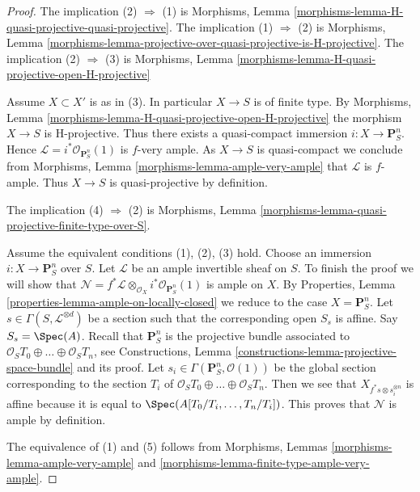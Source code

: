 \begin{proof}
The implication (2) $\Rightarrow$ (1) is
Morphisms, Lemma \ref{morphisms-lemma-H-quasi-projective-quasi-projective}.
The implication (1) $\Rightarrow$ (2) is
Morphisms, Lemma
\ref{morphisms-lemma-projective-over-quasi-projective-is-H-projective}.
The implication (2) $\Rightarrow$ (3) is
Morphisms, Lemma \ref{morphisms-lemma-H-quasi-projective-open-H-projective}

\medskip\noindent
Assume $X \subset X'$ is as in (3). In particular $X \to S$ is
of finite type. By
Morphisms, Lemma \ref{morphisms-lemma-H-quasi-projective-open-H-projective}
the morphism $X \to S$ is H-projective.
Thus there exists a quasi-compact immersion $i : X \to \mathbf{P}^n_S$.
Hence $\mathcal{L} = i^*\mathcal{O}_{\mathbf{P}^n_S}(1)$
is $f$-very ample. As $X \to S$ is quasi-compact we conclude from
Morphisms, Lemma \ref{morphisms-lemma-ample-very-ample}
that $\mathcal{L}$ is $f$-ample. Thus $X \to S$ is quasi-projective
by definition.

\medskip\noindent
The implication (4) $\Rightarrow$ (2) is
Morphisms, Lemma \ref{morphisms-lemma-quasi-projective-finite-type-over-S}.

\medskip\noindent
Assume the equivalent conditions (1), (2), (3) hold.
Choose an immersion $i : X \to \mathbf{P}^n_S$ over $S$.
Let $\mathcal{L}$ be an ample invertible sheaf on $S$. To finish the
proof we will show that
$\mathcal{N} =
f^*\mathcal{L} \otimes_{\mathcal{O}_X} i^*\mathcal{O}_{\mathbf{P}^n_S}(1)$
is ample on $X$. By
Properties, Lemma \ref{properties-lemma-ample-on-locally-closed}
we reduce to the case $X = \mathbf{P}^n_S$. Let
$s \in \Gamma(S, \mathcal{L}^{\otimes d})$ be a section
such that the corresponding open $S_s$ is affine.
Say $S_s = \Spec(A)$.
Recall that $\mathbf{P}^n_S$ is the projective bundle
associated to $\mathcal{O}_S T_0 \oplus \ldots \oplus \mathcal{O}_S T_n$, see
Constructions, Lemma \ref{constructions-lemma-projective-space-bundle}
and its proof.
Let $s_i \in \Gamma(\mathbf{P}^n_S, \mathcal{O}(1))$
be the global section corresponding to the section $T_i$
of $\mathcal{O}_S T_0 \oplus \ldots \oplus \mathcal{O}_S T_n$.
Then we see that $X_{f^*s \otimes s_i^{\otimes n}}$ is affine
because it is equal to $\Spec(A[T_0/T_i, \ldots, T_n/T_i])$.
This proves that $\mathcal{N}$ is ample by definition.

\medskip\noindent
The equivalence of (1) and (5) follows from
Morphisms, Lemmas \ref{morphisms-lemma-ample-very-ample} and
\ref{morphisms-lemma-finite-type-ample-very-ample}.
\end{proof}


